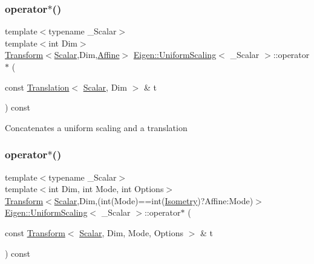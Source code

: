 \subsubsection{\texorpdfstring{operator$\ast$()}{operator*()}\hspace{0.1cm}{\footnotesize\ttfamily [4/8]}}
{\footnotesize\ttfamily template$<$typename \+\_\+\+Scalar$>$ \\
template$<$int Dim$>$ \\
\hyperlink{group___geometry___module_class_eigen_1_1_transform}{Transform}$<$\hyperlink{class_eigen_1_1_uniform_scaling_a04c4339f58f1210c5d4d34b1bd7ae283}{Scalar},Dim,\hyperlink{group__enums_ggaee59a86102f150923b0cac6d4ff05107a71e768e0581725d919d0b05f4cb83234}{Affine}$>$ \hyperlink{class_eigen_1_1_uniform_scaling}{Eigen\+::\+Uniform\+Scaling}$<$ \+\_\+\+Scalar $>$\+::operator$\ast$ (\begin{DoxyParamCaption}\item[{const \hyperlink{group___geometry___module_class_eigen_1_1_translation}{Translation}$<$ \hyperlink{class_eigen_1_1_uniform_scaling_a04c4339f58f1210c5d4d34b1bd7ae283}{Scalar}, Dim $>$ \&}]{t }\end{DoxyParamCaption}) const\hspace{0.3cm}{\ttfamily [inline]}}

Concatenates a uniform scaling and a translation \mbox{\label{class_eigen_1_1_uniform_scaling_a0fc239af586bb24d7db99c6b8ce42373}} 
\subsubsection{\texorpdfstring{operator$\ast$()}{operator*()}\hspace{0.1cm}{\footnotesize\ttfamily [5/8]}}
{\footnotesize\ttfamily template$<$typename \+\_\+\+Scalar$>$ \\
template$<$int Dim, int Mode, int Options$>$ \\
\hyperlink{group___geometry___module_class_eigen_1_1_transform}{Transform}$<$\hyperlink{class_eigen_1_1_uniform_scaling_a04c4339f58f1210c5d4d34b1bd7ae283}{Scalar},Dim,(int(Mode)==int(\hyperlink{group__enums_ggaee59a86102f150923b0cac6d4ff05107a080cd5366173608f701cd945c2335568}{Isometry})?Affine\+:\+Mode)$>$ \hyperlink{class_eigen_1_1_uniform_scaling}{Eigen\+::\+Uniform\+Scaling}$<$ \+\_\+\+Scalar $>$\+::operator$\ast$ (\begin{DoxyParamCaption}\item[{const \hyperlink{group___geometry___module_class_eigen_1_1_transform}{Transform}$<$ \hyperlink{class_eigen_1_1_uniform_scaling_a04c4339f58f1210c5d4d34b1bd7ae283}{Scalar}, Dim, Mode, Options $>$ \&}]{t }\end{DoxyParamCaption}) const\hspace{0.3cm}{\ttfamily [inline]}}

